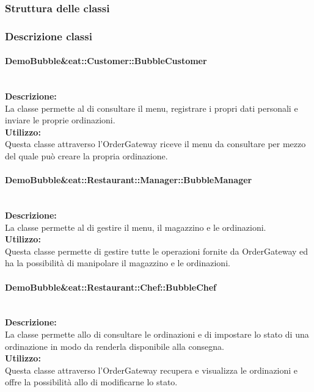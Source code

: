 \begin{samepage}
	\subsubsection{Struttura delle classi}
	\nopagebreak
\end{samepage}

\subsubsection{Descrizione classi}

\paragraph{DemoBubble\&eat\-::Customer\-::Bubble\-Customer}\label{eat-customer}\mbox{}\\
\textbf{Descrizione:}\\
La classe permette al \Customer{} di consultare il menu, registrare i propri dati personali e inviare le proprie ordinazioni.\\
\textbf{Utilizzo:}\\
Questa classe attraverso l'Order\-Gateway riceve il menu da consultare per mezzo del quale può creare la propria ordinazione.\\

\paragraph{Demo\-Bubble\&eat\-::Restaurant\-::Manager\-::Bubble\-Manager}\label{eat-manager}\mbox{}\\
\textbf{Descrizione:}\\
La classe permette al \Manager{} di gestire il menu, il magazzino e le ordinazioni.\\
\textbf{Utilizzo:}\\
Questa classe permette di gestire tutte le operazioni fornite da Order\-Gateway ed ha la possibilità di manipolare il magazzino e le ordinazioni.\\

\paragraph{Demo\-Bubble\&eat\-::Restaurant\-::Chef\-::Bubble\-Chef}\label{eat-chef}\mbox{}\\
\textbf{Descrizione:}\\
La classe permette allo \Chef{} di consultare le ordinazioni e di impostare lo stato di una ordinazione in modo da renderla disponibile alla consegna.\\
\textbf{Utilizzo:}\\
Questa classe attraverso l'Order\-Gateway recupera e visualizza le ordinazioni e offre la possibilità allo \Chef{} di modificarne lo stato.\\

